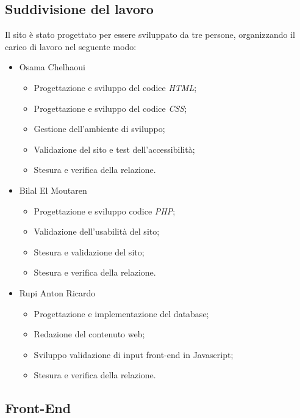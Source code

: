 \documentclass[11pt]{article}
\begin{document}
\subsection{Suddivisione del lavoro}
\label{sec:orgc58824e}
Il sito è stato progettato per essere sviluppato da tre persone, organizzando il carico di lavoro nel seguente modo:
\begin{itemize}
\item Osama Chelhaoui
\begin{itemize}
\item Progettazione e sviluppo del codice \emph{HTML};
\item Progettazione e sviluppo del codice \emph{CSS};
\item Gestione dell'ambiente di sviluppo;
\item Validazione del sito e test dell'accessibilità;
\item Stesura e verifica della relazione.
\end{itemize}
\item Bilal El Moutaren
\begin{itemize}
\item Progettazione e sviluppo codice \emph{PHP};
\item Validazione dell'usabilità del sito;
\item Stesura e validazione del sito;
\item Stesura e verifica della relazione.
\end{itemize}
\item Rupi Anton Ricardo
\begin{itemize}
\item Progettazione e implementazione del database;
\item Redazione del contenuto web;
\item Sviluppo validazione di input front-end in Javascript;
\item Stesura e verifica della relazione.
\end{itemize}
\end{itemize}
\subsection{Front-End}
\label{sec:org20833ff}
\end{document}
